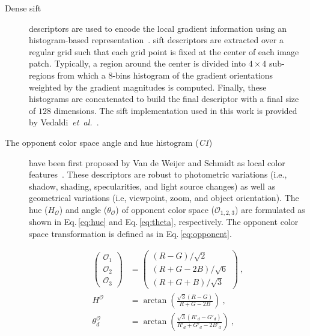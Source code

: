 \begin{description}
\item[Dense \acf{sift}] descriptors are used to encode the local gradient information using an histogram-based representation~\cite{lowe1999object}. 
\ac{sift} descriptors are extracted over a regular grid such that each grid point is fixed at the center of each image patch.
Typically, a region around the center is divided into $4 \times 4$ sub-regions from which a $8$-bins histogram of the gradient orientations weighted by the gradient magnitudes is computed.
Finally, these histograms are concatenated to build the final descriptor with a final size of $128$ dimensions.
The \ac{sift} implementation used in this work is provided by Vedaldi~\emph{et~al.}~\cite{vedaldi2010vlfeat}.

\item[The opponent color space angle and hue histogram (\emph{C1})] have been first proposed by Van de Weijer and Schmidt as local color features~\cite{van2006coloring}.
These descriptors are robust to photometric variations (i.e., shadow, shading, specularities, and light source changes) as well as geometrical variations (i.e, viewpoint, zoom, and object orientation).
The hue ($H_{\mathcal{O}}$) and angle ($\theta_{\mathcal{O}}$) of opponent color space ($\mathcal{O}_{1,2,3}$) are formulated as shown in Eq.\,\ref{eq:hue} and Eq.\,\ref{eq:theta}, respectively.
The opponent color space transformation is defined as in Eq.\,\ref{eq:opponent}.

\begin{align}
    \begin{pmatrix}
      \mathcal{O}_{1}\\\mathcal{O}_{2} \\\mathcal{O}_{3}
    \end{pmatrix} & =
                    \begin{pmatrix}
                      (R-G)/\sqrt{2}\\
                      (R+G-2B)/\sqrt{6}\\
                      (R+G+B)/\sqrt{3}
                    \end{pmatrix}\ , \label{eq:opponent}\\
    H^{\mathcal{O}} & = \arctan\left(\frac{\sqrt{3}(R-G)}{R+G-2B}\right) \ ,\label{eq:hue}\\
    \theta_{d}^{\mathcal{O}} & = \arctan\left(\frac{\sqrt{3}(R'_{d}-G'_{d})}{R'_{d}+G'_{d}-2B'_{d}}\right)\ , \label{eq:theta}
  \end{align}


\end{description}
